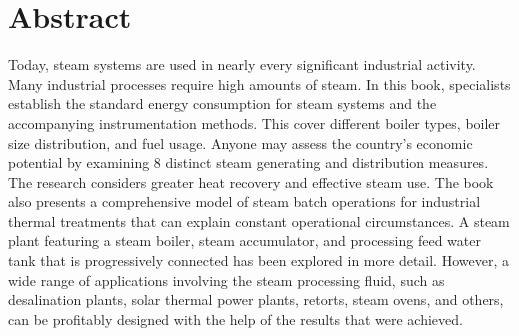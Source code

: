 \section*{Abstract} 
 
Today, steam systems are used in nearly every significant industrial activity. Many industrial processes require high amounts of steam. In this book, specialists establish the standard energy consumption for steam systems and the accompanying instrumentation methods. This cover different boiler types, boiler size distribution, and fuel usage. Anyone may assess the country’s economic potential by examining 8 distinct steam generating and distribution measures. The research considers greater heat recovery and effective steam use. The book also presents a comprehensive model of steam batch operations for industrial thermal treatments that can explain constant operational circumstances. A steam plant featuring a steam boiler, steam accumulator, and processing feed water tank that is progressively connected has been explored in more detail. However, a wide range of applications involving the steam processing fluid, such as desalination plants, solar thermal power plants, retorts, steam ovens, and others, can be profitably designed with the help of the results that were achieved. 
 
